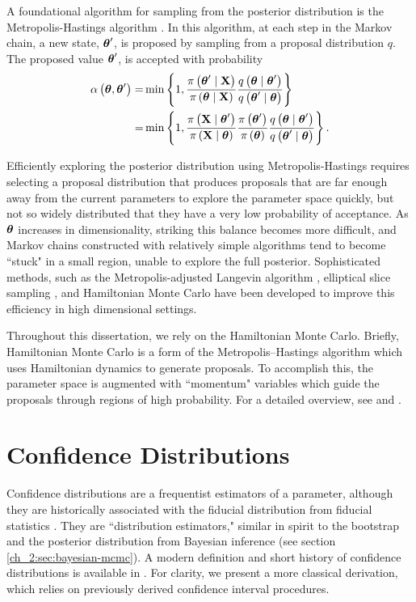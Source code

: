 A foundational algorithm for sampling from the posterior distribution is the Metropolis-Hastings algorithm \citep{Hastings1970Monte}.
In this algorithm, at each step in the Markov chain, a new state, \( \boldsymbol{\theta}^\prime \), is proposed by sampling from a proposal distribution \( q \).
The proposed value \( \boldsymbol{\theta}^\prime \), is accepted with probability 
\begin{align}
\alpha \left( \boldsymbol{\theta}, \boldsymbol{\theta}^\prime \right)   =&   \min \left\{ 1, \frac{\pi \left( \boldsymbol{\theta}^\prime \mid \mathbf{X} \right)}{\pi \left( \boldsymbol{\theta} \mid \mathbf{X} \right)} \frac{q \left( \boldsymbol{\theta} \mid \boldsymbol{\theta}^\prime \right)}{q \left( \boldsymbol{\theta}^\prime \mid \boldsymbol{\theta}  \right)} \right\}    \\
=&  \min \left\{ 1, \frac{\pi \left( \mathbf{X} \mid \boldsymbol{\theta}^\prime  \right)}{\pi \left( \mathbf{X} \mid \boldsymbol{\theta} \right)} \frac{\pi \left( \boldsymbol{\theta}^\prime \right)}{\pi \left( \boldsymbol{\theta} \right)} \frac{q \left( \boldsymbol{\theta} \mid \boldsymbol{\theta}^\prime \right)}{q \left( \boldsymbol{\theta}^\prime \mid \boldsymbol{\theta}  \right)} \right\}.
\end{align}

Efficiently exploring the posterior distribution using Metropolis-Hastings requires selecting a proposal distribution that produces proposals that are far enough away from the current parameters to explore the parameter space quickly, but not so widely distributed that they have a very low probability of acceptance.
As \( \boldsymbol{\theta} \) increases in dimensionality, striking this balance becomes more difficult, and Markov chains constructed with relatively simple algorithms tend to become ``stuck" in a small region, unable to explore the full posterior.
Sophisticated methods, such as the Metropolis-adjusted Langevin algorithm \citep{Besag1994Comments}, elliptical slice sampling \citep{Murray202Elliptical}, and Hamiltonian Monte Carlo \citep{Duane1987Hybrid} have been developed to improve this efficiency in high dimensional settings.

Throughout this dissertation, we rely on the Hamiltonian Monte Carlo.
Briefly, Hamiltonian Monte Carlo is a form of the Metropolis–Hastings algorithm which uses Hamiltonian dynamics to generate proposals.
To accomplish this, the parameter space is augmented with ``momentum" variables which guide the proposals through regions of high probability.
For a detailed overview, see \citep{neal2011mcmc} and \citep{betancourt2018conceptual}.

\section{Confidence Distributions}
\label{ch_2:sec:confidence_distributions}
Confidence distributions are a frequentist estimators of a parameter, although they are historically associated with the fiducial distribution from fiducial statistics \citep{Xie2013}.
They are ``distribution estimators," similar in spirit to the bootstrap and the posterior distribution from Bayesian inference (see section \ref{ch_2:sec:bayesian-mcmc}).
A modern definition and short history of confidence distributions is available in \citep{Xie2013}.
For clarity, we present a more classical derivation, which relies on previously derived confidence interval procedures.

